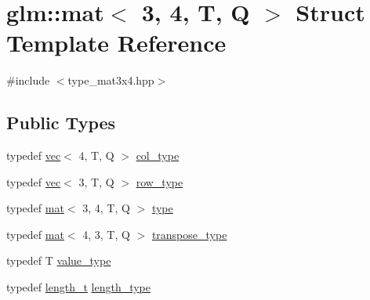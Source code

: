 \hypertarget{structglm_1_1mat_3_013_00_014_00_01_t_00_01_q_01_4}{}\section{glm\+:\+:mat$<$ 3, 4, T, Q $>$ Struct Template Reference}
\label{structglm_1_1mat_3_013_00_014_00_01_t_00_01_q_01_4}


{\ttfamily \#include $<$type\+\_\+mat3x4.\+hpp$>$}

\subsection*{Public Types}
\begin{DoxyCompactItemize}
\item 
typedef \hyperlink{structglm_1_1vec}{vec}$<$ 4, T, Q $>$ \hyperlink{structglm_1_1mat_3_013_00_014_00_01_t_00_01_q_01_4_aaa23c4674cbe2dc1eda1d826b8ef721e}{col\+\_\+type}
\item 
typedef \hyperlink{structglm_1_1vec}{vec}$<$ 3, T, Q $>$ \hyperlink{structglm_1_1mat_3_013_00_014_00_01_t_00_01_q_01_4_a14121d7d6181d3e9eea914373f795c6c}{row\+\_\+type}
\item 
typedef \hyperlink{structglm_1_1mat}{mat}$<$ 3, 4, T, Q $>$ \hyperlink{structglm_1_1mat_3_013_00_014_00_01_t_00_01_q_01_4_a6742d5174ea43a0298a2bceb2636736a}{type}
\item 
typedef \hyperlink{structglm_1_1mat}{mat}$<$ 4, 3, T, Q $>$ \hyperlink{structglm_1_1mat_3_013_00_014_00_01_t_00_01_q_01_4_af38d159b4f750dd5fab7d19b44c82731}{transpose\+\_\+type}
\item 
typedef T \hyperlink{structglm_1_1mat_3_013_00_014_00_01_t_00_01_q_01_4_a5fafacf57e2d28a8de693056c450088c}{value\+\_\+type}
\item 
typedef \hyperlink{namespaceglm_a090a0de2260835bee80e71a702492ed9}{length\+\_\+t} \hyperlink{structglm_1_1mat_3_013_00_014_00_01_t_00_01_q_01_4_a6a07c3870b8e6d4ba5f1ec8fa988d9bf}{length\+\_\+type}
\end{DoxyCompactItemize}
